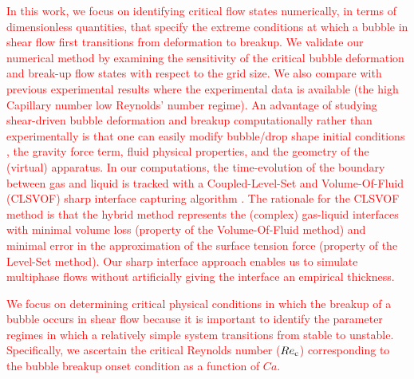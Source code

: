 \documentclass{elsarticle}
\begin{document}
\par
\textcolor{red} {
	In this work, we focus on identifying critical flow states numerically, in terms of dimensionless quantities, that specify the extreme conditions at which a bubble in shear flow first transitions from deformation to breakup.  We validate our numerical method by examining the sensitivity of the critical bubble deformation and break-up flow states with respect to the grid size.  We also compare with previous experimental results where the experimental data is available (the high Capillary number low Reynolds' number regime).  An advantage of studying shear-driven bubble deformation and breakup computationally rather than experimentally is that one can easily modify bubble/drop shape initial conditions \cite{ohta2005computational}, the gravity force term\cite{hoyt2013performance}, fluid physical properties, and the geometry of the (virtual) apparatus\cite{FRENSE2024120579}.  In our computations, the time-evolution of the boundary between gas and liquid is tracked with a Coupled-Level-Set and Volume-Of-Fluid (CLSVOF) sharp interface capturing algorithm \cite{SusPuc00,SusSmiHusOhtZhi07}.  The rationale for the CLSVOF method is that the hybrid method represents the (complex) gas-liquid interfaces with minimal volume loss (property of the Volume-Of-Fluid method) and minimal error in the approximation of the surface tension force (property of the Level-Set method).  Our sharp interface approach\cite{SusSmiHusOhtZhi07,Sus03,KanFedLiu00} enables us to simulate multiphase flows without artificially giving the interface an empirical thickness.
}
\par
\textcolor{red} {
We focus on determining critical physical conditions in which the breakup of a bubble occurs in shear flow because it is important to identify the parameter regimes in which a relatively simple system transitions from stable to unstable.  Specifically, we ascertain the critical Reynolds number ($Re_{\rm c}$) corresponding to the bubble breakup onset condition as a function of $Ca$.  
}
\par
\end{document}
